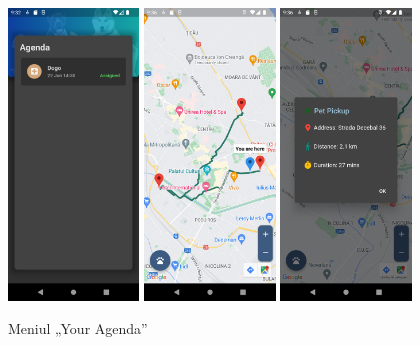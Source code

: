 \newpage

\begin{figure}[ht]
    \centering
    \includegraphics[width=0.31\textwidth]{images/screenshots/agenda.png}
    \includegraphics[width=0.31\textwidth]{images/screenshots/location_tracker.png}
    \includegraphics[width=0.31\textwidth]{images/screenshots/marker_info.png}
    \caption{Meniul „Your Agenda”}
    \label{fig:your_agenda}
\end{figure}


